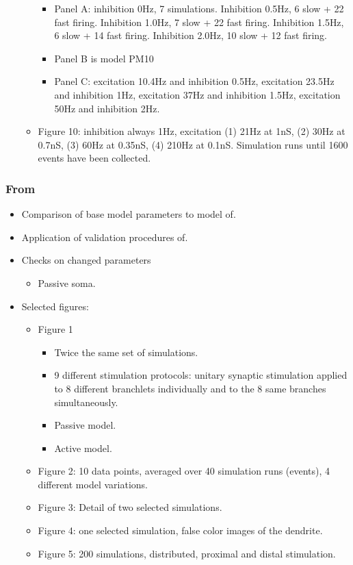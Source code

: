 \documentclass[12pt]{article}
\begin{document}
\begin{itemize}
\begin{itemize}
\begin{itemize}
    \item Panel A: inhibition 0Hz, 7 simulations.  Inhibition 0.5Hz, 6
      slow + 22 fast firing.  Inhibition 1.0Hz, 7 slow + 22 fast
      firing.  Inhibition 1.5Hz, 6 slow + 14 fast firing.  Inhibition
      2.0Hz, 10 slow + 12 fast firing.
    \item Panel B is model PM10
    \item Panel C: excitation 10.4Hz and inhibition 0.5Hz, excitation
      23.5Hz and inhibition 1Hz, excitation 37Hz and inhibition 1.5Hz,
      excitation 50Hz and inhibition 2Hz.
    \end{itemize}
  \item Figure 10: inhibition always 1Hz, excitation (1) 21Hz at 1nS,
    (2) 30Hz at 0.7nS, (3) 60Hz at 0.35nS, (4) 210Hz at 0.1nS.
    Simulation runs until 1600 events have been collected.
  \end{itemize}
\end{itemize}

\subsubsection*{From~\cite{schutter94:_simul_purkin}}

\begin{itemize}
\item Comparison of base model parameters to model of\cite{E:1994hc}.
\item Application of validation procedures of\cite{De-Schutter-E:1994vn}.
\item Checks on changed parameters
  \begin{itemize}
  \item Passive soma.
  \end{itemize}
\item Selected figures:
  \begin{itemize}
  \item Figure 1
    \begin{itemize}
    \item Twice the same set of simulations.
    \item 9 different stimulation protocols: unitary synaptic
      stimulation applied to 8 different branchlets individually and
      to the 8 same branches simultaneously.
    \item Passive model.
    \item Active model.
    \end{itemize}
  \item Figure 2: 10 data points, averaged over 40 simulation runs
    (events), 4 different model variations.
  \item Figure 3: Detail of two selected simulations.
  \item Figure 4: one selected simulation, false color images of the
    dendrite.
  \item Figure 5: 200 simulations, distributed, proximal and distal
    stimulation.
  \end{itemize}
\end{itemize}
\end{document}
